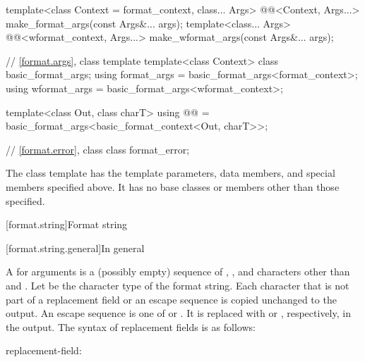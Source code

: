 \begin{codeblock}
{  template<class Context = format_context, class... Args>
    @@<Context, Args...>
      make_format_args(const Args&... args);
  template<class... Args>
    @@<wformat_context, Args...>
      make_wformat_args(const Args&... args);

  // \ref{format.args}, class template 
  template<class Context> class basic_format_args;
  using format_args = basic_format_args<format_context>;
  using wformat_args = basic_format_args<wformat_context>;

  template<class Out, class charT>
    using @@ = basic_format_args<basic_format_context<Out, charT>>;

  // \ref{format.error}, class 
  class format_error;
}
\end{codeblock}


\pnum
The class template 
has the template parameters, data members, and special members specified above.
It has no base classes or members other than those specified.

[format.string]{Format string}

[format.string.general]{In general}

\newcommand{\fmtnontermdef}[1]{{\BnfNontermshape#1\itcorr}\textnormal{:}}
\newcommand{\fmtgrammarterm}[1]{\gterm{#1}}

\pnum
A  for arguments  is
a (possibly empty) sequence of
,
,
and characters other than \tcode{\{} and \tcode{\}}.
Let  be the character type of the format string.
Each character that is not part of
a replacement field or an escape sequence
is copied unchanged to the output.
An escape sequence is one of \tcode{\{\{} or \tcode{\}\}}.
It is replaced with \tcode{\{} or \tcode{\}}, respectively, in the output.
The syntax of replacement fields is as follows:

\begin{ncbnf}
\fmtnontermdef{replacement-field}\br
    \terminal{\{}   \terminal{\}}
\end{ncbnf}

